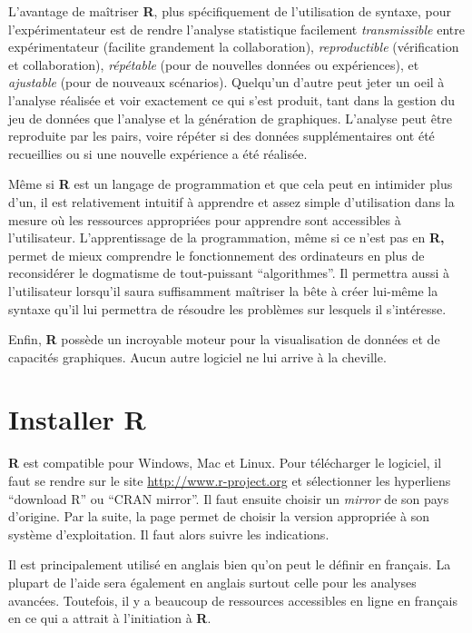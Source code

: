 \documentclass[
]{book}
\begin{document}
L'avantage de maîtriser \textbf{R}, plus spécifiquement de l'utilisation de syntaxe, pour l'expérimentateur est de rendre l'analyse statistique facilement \emph{transmissible} entre expérimentateur (facilite grandement la collaboration), \emph{reproductible} (vérification et collaboration), \emph{répétable} (pour de nouvelles données ou expériences), et \emph{ajustable} (pour de nouveaux scénarios). Quelqu'un d'autre peut jeter un oeil à l'analyse réalisée et voir exactement ce qui s'est produit, tant dans la gestion du jeu de données que l'analyse et la génération de graphiques. L'analyse peut être reproduite par les pairs, voire répéter si des données supplémentaires ont été recueillies ou si une nouvelle expérience a été réalisée.

Même si \textbf{R} est un langage de programmation et que cela peut en intimider plus d'un, il est relativement intuitif à apprendre et assez simple d'utilisation dans la mesure où les ressources appropriées pour apprendre sont accessibles à l'utilisateur. L'apprentissage de la programmation, même si ce n'est pas en \textbf{R,} permet de mieux comprendre le fonctionnement des ordinateurs en plus de reconsidérer le dogmatisme de tout-puissant ``algorithmes''. Il permettra aussi à l'utilisateur lorsqu'il saura suffisamment maîtriser la bête à créer lui-même la syntaxe qu'il lui permettra de résoudre les problèmes sur lesquels il s'intéresse.

Enfin, \textbf{R} possède un incroyable moteur pour la visualisation de données et de capacités graphiques. Aucun autre logiciel ne lui arrive à la cheville.

\hypertarget{installer-r}{%
\section{\texorpdfstring{Installer \textbf{R}}{Installer R}}\label{installer-r}}

\textbf{R} est compatible pour Windows, Mac et Linux. Pour télécharger le logiciel, il faut se rendre sur le site \url{http://www.r-project.org} et sélectionner les hyperliens ``download R'' ou ``CRAN mirror''. Il faut ensuite choisir un \emph{mirror} de son pays d'origine. Par la suite, la page permet de choisir la version appropriée à son système d'exploitation. Il faut alors suivre les indications.

Il est principalement utilisé en anglais bien qu'on peut le définir en français. La plupart de l'aide sera également en anglais surtout celle pour les analyses avancées. Toutefois, il y a beaucoup de ressources accessibles en ligne en français en ce qui a attrait à l'initiation à \textbf{R}.
\end{document}
